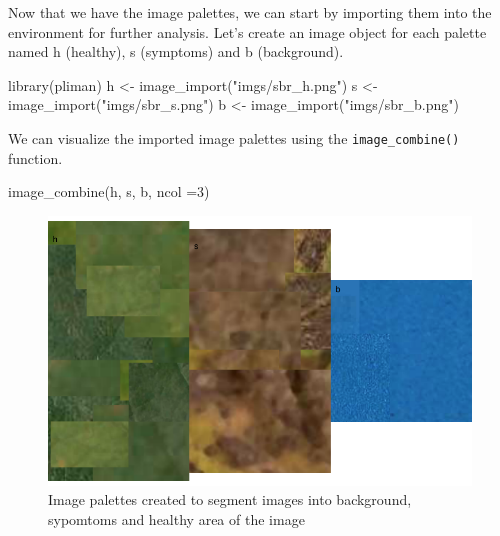 \documentclass[
  letterpaper,
  DIV=11,
  numbers=noendperiod]{scrreprt}
\newenvironment{Shaded}{\begin{snugshade}}{\end{snugshade}}
\newcommand{\AttributeTok}[1]{\textcolor[rgb]{0.40,0.45,0.13}{#1}}
\newcommand{\DecValTok}[1]{\textcolor[rgb]{0.68,0.00,0.00}{#1}}
\newcommand{\FunctionTok}[1]{\textcolor[rgb]{0.28,0.35,0.67}{#1}}
\newcommand{\NormalTok}[1]{\textcolor[rgb]{0.00,0.23,0.31}{#1}}
\newcommand{\OtherTok}[1]{\textcolor[rgb]{0.00,0.23,0.31}{#1}}
\newcommand{\StringTok}[1]{\textcolor[rgb]{0.13,0.47,0.30}{#1}}
\begin{document}
Now that we have the image palettes, we can start by importing them into
the environment for further analysis. Let's create an image object for
each palette named h (healthy), s (symptoms) and b (background).

\begin{Shaded}
\begin{Highlighting}[]
\FunctionTok{library}\NormalTok{(pliman)}
\NormalTok{h }\OtherTok{\textless{}{-}} \FunctionTok{image\_import}\NormalTok{(}\StringTok{"imgs/sbr\_h.png"}\NormalTok{)}
\NormalTok{s }\OtherTok{\textless{}{-}} \FunctionTok{image\_import}\NormalTok{(}\StringTok{"imgs/sbr\_s.png"}\NormalTok{)}
\NormalTok{b }\OtherTok{\textless{}{-}} \FunctionTok{image\_import}\NormalTok{(}\StringTok{"imgs/sbr\_b.png"}\NormalTok{)}
\end{Highlighting}
\end{Shaded}

We can visualize the imported image palettes using the
\texttt{image\_combine()} function.

\begin{Shaded}
\begin{Highlighting}[]
\FunctionTok{image\_combine}\NormalTok{(h, s, b, }\AttributeTok{ncol =}\DecValTok{3}\NormalTok{)}
\end{Highlighting}
\end{Shaded}

\begin{figure}[H]

{\centering \includegraphics{./data-actual-severity_files/figure-pdf/fig-palettes-1.pdf}

}

\caption{\label{fig-palettes}Image palettes created to segment images
into background, sypomtoms and healthy area of the image}

\end{figure}
\end{document}
